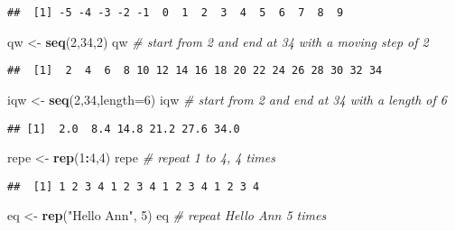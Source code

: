 \documentclass[
]{article}
\newenvironment{Shaded}{\begin{snugshade}}{\end{snugshade}}
\newcommand{\AttributeTok}[1]{\textcolor[rgb]{0.13,0.29,0.53}{#1}}
\newcommand{\CommentTok}[1]{\textcolor[rgb]{0.56,0.35,0.01}{\textit{#1}}}
\newcommand{\DecValTok}[1]{\textcolor[rgb]{0.00,0.00,0.81}{#1}}
\newcommand{\FunctionTok}[1]{\textcolor[rgb]{0.13,0.29,0.53}{\textbf{#1}}}
\newcommand{\NormalTok}[1]{#1}
\newcommand{\OtherTok}[1]{\textcolor[rgb]{0.56,0.35,0.01}{#1}}
\newcommand{\SpecialCharTok}[1]{\textcolor[rgb]{0.81,0.36,0.00}{\textbf{#1}}}
\newcommand{\StringTok}[1]{\textcolor[rgb]{0.31,0.60,0.02}{#1}}
\begin{document}
\begin{verbatim}
##  [1] -5 -4 -3 -2 -1  0  1  2  3  4  5  6  7  8  9
\end{verbatim}

\begin{Shaded}
\begin{Highlighting}[]
\NormalTok{qw }\OtherTok{\textless{}{-}} \FunctionTok{seq}\NormalTok{(}\DecValTok{2}\NormalTok{,}\DecValTok{34}\NormalTok{,}\DecValTok{2}\NormalTok{)}
\NormalTok{qw }\CommentTok{\# start from 2 and end at 34 with a moving step of 2}
\end{Highlighting}
\end{Shaded}

\begin{verbatim}
##  [1]  2  4  6  8 10 12 14 16 18 20 22 24 26 28 30 32 34
\end{verbatim}

\begin{Shaded}
\begin{Highlighting}[]
\NormalTok{iqw }\OtherTok{\textless{}{-}} \FunctionTok{seq}\NormalTok{(}\DecValTok{2}\NormalTok{,}\DecValTok{34}\NormalTok{,}\AttributeTok{length=}\DecValTok{6}\NormalTok{)}
\NormalTok{iqw }\CommentTok{\# start from  2 and end at 34 with a length of 6}
\end{Highlighting}
\end{Shaded}

\begin{verbatim}
## [1]  2.0  8.4 14.8 21.2 27.6 34.0
\end{verbatim}

\begin{Shaded}
\begin{Highlighting}[]
\NormalTok{repe }\OtherTok{\textless{}{-}} \FunctionTok{rep}\NormalTok{(}\DecValTok{1}\SpecialCharTok{:}\DecValTok{4}\NormalTok{,}\DecValTok{4}\NormalTok{) }
\NormalTok{repe }\CommentTok{\# repeat 1 to 4, 4 times}
\end{Highlighting}
\end{Shaded}

\begin{verbatim}
##  [1] 1 2 3 4 1 2 3 4 1 2 3 4 1 2 3 4
\end{verbatim}

\begin{Shaded}
\begin{Highlighting}[]
\NormalTok{eq }\OtherTok{\textless{}{-}} \FunctionTok{rep}\NormalTok{(}\StringTok{"Hello Ann"}\NormalTok{, }\DecValTok{5}\NormalTok{) }
\NormalTok{eq }\CommentTok{\# repeat Hello Ann 5 times}
\end{Highlighting}
\end{Shaded}
\end{document}
